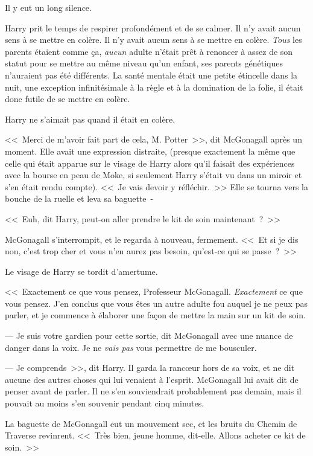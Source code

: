 Il y eut un long silence.

Harry prit le temps de respirer profondément et de se calmer. Il n'y avait aucun sens à se mettre en colère. Il n'y avait aucun sens à se mettre en colère. \emph{Tous} les parents étaient comme ça, \emph{aucun} adulte n'était prêt à renoncer à assez de son statut pour se mettre au même niveau qu'un enfant, ses parents génétiques n'auraient pas été différents. La santé mentale était une petite étincelle dans la nuit, une exception infinitésimale à la règle et à la domination de la folie, il était donc futile de se mettre en colère.

Harry ne s'aimait pas quand il était en colère.

<<~Merci de m'avoir fait part de cela, M. Potter~>>, dit McGonagall après un moment. Elle avait une expression distraite, (presque exactement la même que celle qui était apparue sur le visage de Harry alors qu'il faisait des expériences avec la bourse en peau de Moke, si seulement Harry s'était vu dans un miroir et s'en était rendu compte). <<~Je vais devoir y réfléchir.~>> Elle se tourna vers la bouche de la ruelle et leva sa baguette~-

<<~Euh, dit Harry, peut-on aller prendre le kit de soin maintenant~?~>>

McGonagall s'interrompit, et le regarda à nouveau, fermement. <<~Et si je dis non, c'est trop cher et vous n'en aurez pas besoin, qu'est-ce qui se passe~?~>>

Le visage de Harry se tordit d'amertume. 

<<~Exactement ce que vous pensez, Professeur McGonagall. \emph{Exactement} ce que vous pensez. J'en conclus que vous êtes un autre adulte fou auquel je ne peux pas parler, et je commence à élaborer une façon de mettre la main sur un kit de soin.

--- Je suis votre gardien pour cette sortie, dit McGonagall avec une nuance de danger dans la voix. Je ne \emph{vais pas} vous permettre de me bousculer.

--- Je comprends~>>, dit Harry. Il garda la rancœur hors de sa voix, et ne dit aucune des autres choses qui lui venaient à l'esprit. McGonagall lui avait dit de penser avant de parler. Il ne s'en souviendrait probablement pas demain, mais il pouvait au moins s'en souvenir pendant cinq minutes.

La baguette de McGonagall eut un mouvement sec, et les bruits du Chemin de Traverse revinrent. <<~Très bien, jeune homme, dit-elle. Allons acheter ce kit de soin.~>>

